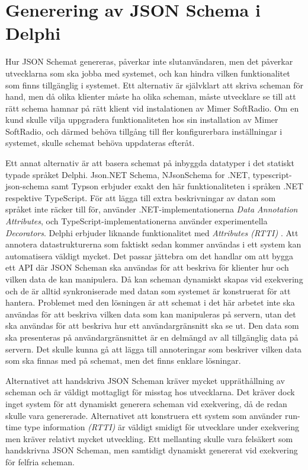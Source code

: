 \section{Generering av JSON Schema i Delphi}

Hur JSON Schemat genereras, påverkar inte slutanvändaren, men det påverkar utvecklarna som ska jobba med systemet, och kan hindra vilken funktionalitet som finns tillgänglig i systemet. Ett alternativ är självklart att skriva scheman för hand, men då olika klienter måste ha olika scheman, måste utvecklare se till att rätt schema hamnar på rätt klient vid instalationen av Mimer SoftRadio. Om en kund skulle vilja uppgradera funktionaliteten hos sin installation av Mimer SoftRadio, och därmed behöva tillgång till fler konfigurerbara inställningar i systemet, skulle schemat behöva uppdateras efteråt.

Ett annat alternativ är att basera schemat på inbyggda datatyper i det statiskt typade språket Delphi. Json.NET Schema, NJsonSchema for .NET, typescript-json-schema samt Typson erbjuder exakt den här funktionaliteten i språken .NET respektive TypeScript. För att lägga till extra beskrivningar av datan som språket inte räcker till för, använder .NET-implementationerna \textit{Data Annotation Attributes}, och TypeScript-implementationerna använder experimentella \textit{Decorators}. \cite{Suter,Newtonsoft,El-Dardiry,Bovet} Delphi erbjuder liknande funktionalitet med \textit{Attributes (RTTI)} \cite{Embarcadero2016}. Att annotera datastrukturerna som faktiskt sedan kommer användas i ett system kan automatisera väldigt mycket. Det passar jättebra om det handlar om att bygga ett API där JSON Scheman ska användas för att beskriva för klienter hur och vilken data de kan manipulera. Då kan scheman dynamiskt skapas vid exekvering och de är alltid synkroniserade med datan som systemet är konstruerat för att hantera. Problemet med den lösningen är att schemat i det här arbetet inte ska användas för att beskriva vilken data som kan manipuleras på servern, utan det ska användas för att beskriva hur ett användargränsnitt ska se ut. Den data som ska presenteras på användargränsnittet är en delmängd av all tillgänglig data på servern. Det skulle kunna gå att lägga till annoteringar som beskriver vilken data som ska finnas med på schemat, men det finns enklare lösningar.

Alternativet att handskriva JSON Scheman kräver mycket uppräthållning av scheman och är väldigt mottagligt för misstag hos utvecklarna. Det kräver dock inget system för att dynamiskt generera scheman vid exekvering, då de redan skulle vara genererade. Alternativet att konstruera ett system som använder run-time type information \textit{(RTTI)} är väldigt smidigt för utvecklare under exekvering men kräver relativt mycket utveckling. Ett mellanting skulle vara felsäkert som handskrivna JSON Scheman, men samtidigt dynamiskt genererat vid exekvering för felfria scheman.


